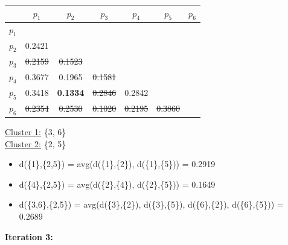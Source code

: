 \documentclass[11pt]{article}
\begin{document}
	\begin{center}
    	\begin{adjustbox}{max width=\textwidth}
		\begin{tabular}{ | c | c | c | c | c | c | c |}
	  	 	\hline

	  	 	& \textbf{$p_1$} & \textbf{$p_2$} & \textbf{$p_3$} & \textbf{$p_4$} & \textbf{$p_5$} & \textbf{$p_6$}\\
	  	 	\hline
	  	 	
	  	 	\textbf{$p_1$} &  &  &  &  &  &\\
	  	 	\hline
	  	 	
	  	 	\textbf{$p_2$} & 0.2421 &  &  &  &  &  \\
	  	 	\hline
	  	 	
	  	 	\textbf{$p_3$} & \st{0.2159} & \st{0.1523} &  &  &  & \\
	  	 	\hline
	  	 	
	  	 	\textbf{$p_4$} & 0.3677 & 0.1965 & \st{0.1581} &  &  & \\
	  	 	\hline
	  	 	
	  	 	\textbf{$p_5$} & 0.3418 & \textbf{0.1334} & \st{0.2846} & 0.2842 &  & \\
	  	 	\hline	
	  	 	
	  	 	\textbf{$p_6$} & \st{0.2354} & \st{0.2530} & \st{0.1020} & \st{0.2195} & \st{0.3860} & \\
	  	 	\hline			
    		\end{tabular}
    	\end{adjustbox}
	\end{center}
	
	\underline{Cluster 1:} \{3, 6\} \\
	\underline{Cluster 2:} \{2, 5\} \\
	
	
	\begin{itemize}
		\item d(\{1\},\{2,5\}) = avg(d(\{1\},\{2\}), d(\{1\},\{5\})) = 0.2919
		\item d(\{4\},\{2,5\}) = avg(d(\{2\},\{4\}), d(\{2\},\{5\})) = 0.1649
		\item d(\{3,6\},\{2,5\}) = avg(d(\{3\},\{2\}), d(\{3\},\{5\}), d(\{6\},\{2\}), d(\{6\},\{5\})) = 0.2689
	\end{itemize}
	
	
	\textbf{Iteration 3:}
	
\end{document}
